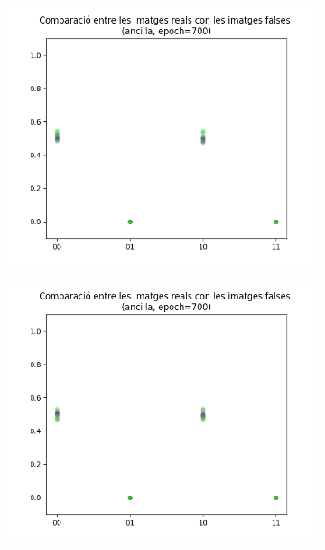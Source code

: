 \begin{figure}
	\begin{subfigure}[b]{.32\linewidth}
		\includegraphics[width=\linewidth]{figures/data/scatter_plot_A4.png}
		\caption{}
	\end{subfigure}
	\begin{subfigure}[b]{.32\linewidth}
		\includegraphics[width=\linewidth]{figures/data/scatter_plot_A5.png}
		\caption{}
	\end{subfigure}
	\begin{subfigure}[b]{.32\linewidth}

\end{subfigure}
\end{figure}
